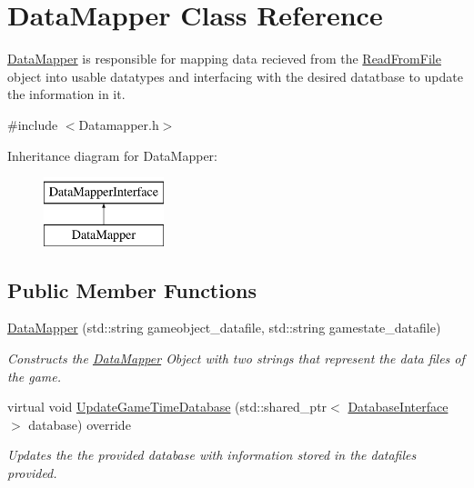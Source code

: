 \hypertarget{class_data_mapper}{}\section{Data\+Mapper Class Reference}
\label{class_data_mapper}


\hyperlink{class_data_mapper}{Data\+Mapper} is responsible for mapping data recieved from the \hyperlink{class_read_from_file}{Read\+From\+File} object into usable datatypes and interfacing with the desired datatbase to update the information in it.  




{\ttfamily \#include $<$Datamapper.\+h$>$}

Inheritance diagram for Data\+Mapper\+:\begin{figure}[H]
\begin{center}
\leavevmode
\includegraphics[height=2.000000cm]{dd/da0/class_data_mapper}
\end{center}
\end{figure}
\subsection*{Public Member Functions}
\begin{DoxyCompactItemize}
\item 
\hyperlink{class_data_mapper_a4603cf7c03ad31b454669ad61e64919f}{Data\+Mapper} (std\+::string gameobject\+\_\+datafile, std\+::string gamestate\+\_\+datafile)
\begin{DoxyCompactList}\small\item\em Constructs the \hyperlink{class_data_mapper}{Data\+Mapper} Object with two strings that represent the data files of the game. \end{DoxyCompactList}\item 
virtual void \hyperlink{class_data_mapper_ade3e27146120b3cb74d556e8b9e48526}{Update\+Game\+Time\+Database} (std\+::shared\+\_\+ptr$<$ \hyperlink{class_database_interface}{Database\+Interface} $>$ database) override
\begin{DoxyCompactList}\small\item\em Updates the the provided database with information stored in the datafiles provided. \end{DoxyCompactList}\end{DoxyCompactItemize}

